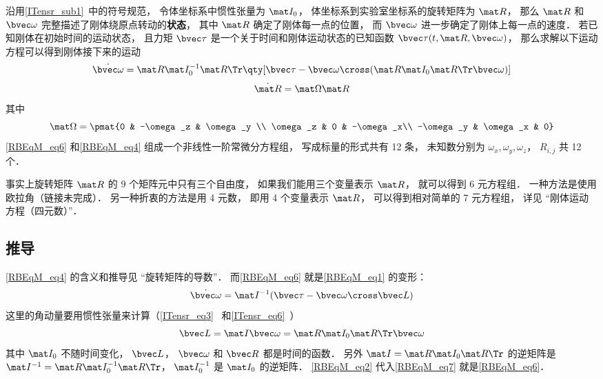 沿用\autoref{ITensr_sub1}~中的符号规范， 令体坐标系中惯性张量为 $\mat I_0$， 体坐标系到实验室坐标系的旋转矩阵为 $\mat R$， 那么 $\mat R$ 和 $\bvec \omega$ 完整描述了刚体绕原点转动的\textbf{状态}， 其中 $\mat R$ 确定了刚体每一点的位置， 而 $\bvec \omega$ 进一步确定了刚体上每一点的速度． 若已知刚体在初始时间的运动状态， 且力矩 $\bvec \tau$ 是一个关于时间和刚体运动状态的已知函数 $\bvec \tau(t, \mat R, \bvec\omega)$， 那么求解以下运动方程可以得到刚体接下来的运动
\begin{equation}\label{RBEqM_eq6}
\dot{\bvec \omega} = \mat R \mat I_0^{-1} \mat R\Tr \qty[\bvec \tau  - \bvec\omega\cross(\mat R \mat I_0 \mat R\Tr \bvec\omega)]
\end{equation}
\begin{equation}\label{RBEqM_eq4}
\dot{\mat R} = \mat\Omega \mat R
\end{equation}
其中
\begin{equation}\label{RBEqM_eq5}
\mat\Omega = \pmat{0 & -\omega_z & \omega_y \\ \omega_z & 0 & -\omega_x\\ -\omega_y & \omega_x & 0}
\end{equation}
\autoref{RBEqM_eq6} 和\autoref{RBEqM_eq4} 组成一个非线性一阶常微分方程组， 写成标量的形式共有 12 条， 未知数分别为 $\omega_x, \omega_y, \omega_z$， $R_{i,j}$ 共 12 个．

事实上旋转矩阵 $\mat R$ 的 9 个矩阵元中只有三个自由度， 如果我们能用三个变量表示 $\mat R$， 就可以得到 6 元方程组． 一种方法是使用欧拉角（链接未完成）． 另一种折衷的方法是用 4 元数， 即用 4 个变量表示 $\mat R$， 可以得到相对简单的 7 元方程组， 详见 “刚体运动方程（四元数）”．

\subsection{推导}

\autoref{RBEqM_eq4} 的含义和推导见 “旋转矩阵的导数”． 而\autoref{RBEqM_eq6} 就是\autoref{RBEqM_eq1} 的变形：
\begin{equation}\label{RBEqM_eq7}
\dot{\bvec \omega} = \mat I^{-1} (\bvec\tau - \bvec\omega\cross\bvec L)
\end{equation}
这里的角动量要用惯性张量来计算（\autoref{ITensr_eq3}~ 和\autoref{ITensr_eq6}~）
\begin{equation}\label{RBEqM_eq2}
\bvec L = \mat I \bvec \omega = \mat R \mat I_0 \mat R\Tr \bvec \omega
\end{equation}
其中 $\mat I_0$ 不随时间变化， $\bvec L$， $\bvec \omega$ 和 $\bvec R$ 都是时间的函数． 另外 $\mat I = \mat R \mat I_0 \mat R\Tr$ 的逆矩阵是 $\mat I^{-1} = \mat R \mat I_0^{-1} \mat R\Tr$， $\mat I_0^{-1}$ 是 $\mat I_0$ 的逆矩阵． \autoref{RBEqM_eq2} 代入\autoref{RBEqM_eq7} 就是\autoref{RBEqM_eq6}．

